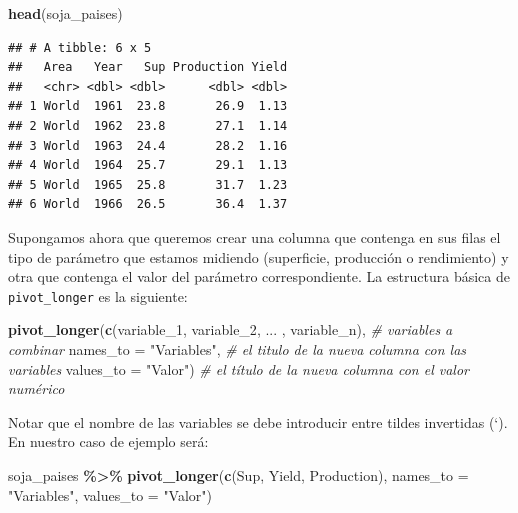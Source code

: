 \documentclass[
]{article}
\newenvironment{Shaded}{\begin{snugshade}}{\end{snugshade}}
\newcommand{\AttributeTok}[1]{\textcolor[rgb]{0.13,0.29,0.53}{#1}}
\newcommand{\CommentTok}[1]{\textcolor[rgb]{0.56,0.35,0.01}{\textit{#1}}}
\newcommand{\FunctionTok}[1]{\textcolor[rgb]{0.13,0.29,0.53}{\textbf{#1}}}
\newcommand{\NormalTok}[1]{#1}
\newcommand{\SpecialCharTok}[1]{\textcolor[rgb]{0.81,0.36,0.00}{\textbf{#1}}}
\newcommand{\StringTok}[1]{\textcolor[rgb]{0.31,0.60,0.02}{#1}}
\begin{document}
\begin{Shaded}
\begin{Highlighting}[]
\FunctionTok{head}\NormalTok{(soja\_paises)}
\end{Highlighting}
\end{Shaded}

\begin{verbatim}
## # A tibble: 6 x 5
##   Area   Year   Sup Production Yield
##   <chr> <dbl> <dbl>      <dbl> <dbl>
## 1 World  1961  23.8       26.9  1.13
## 2 World  1962  23.8       27.1  1.14
## 3 World  1963  24.4       28.2  1.16
## 4 World  1964  25.7       29.1  1.13
## 5 World  1965  25.8       31.7  1.23
## 6 World  1966  26.5       36.4  1.37
\end{verbatim}

Supongamos ahora que queremos crear una columna que contenga en sus
filas el tipo de parámetro que estamos midiendo (superficie, producción
o rendimiento) y otra que contenga el valor del parámetro
correspondiente. La estructura básica de \texttt{pivot\_longer} es la
siguiente:

\begin{Shaded}
\begin{Highlighting}[]
\FunctionTok{pivot\_longer}\NormalTok{(}\FunctionTok{c}\NormalTok{(}\StringTok{\textasciigrave{}}\AttributeTok{variable\_1}\StringTok{\textasciigrave{}}\NormalTok{, }\StringTok{\textasciigrave{}}\AttributeTok{variable\_2}\StringTok{\textasciigrave{}}\NormalTok{, ... , }\StringTok{\textasciigrave{}}\AttributeTok{variable\_n}\StringTok{\textasciigrave{}}\NormalTok{), }\CommentTok{\# variables a combinar}
       \AttributeTok{names\_to =} \StringTok{"Variables"}\NormalTok{, }\CommentTok{\# el titulo de la nueva columna con las variables}
       \AttributeTok{values\_to =} \StringTok{"Valor"}\NormalTok{) }\CommentTok{\# el título de la nueva columna con el valor numérico}
\end{Highlighting}
\end{Shaded}

Notar que el nombre de las variables se debe introducir entre tildes
invertidas (`). En nuestro caso de ejemplo será:

\begin{Shaded}
\begin{Highlighting}[]
\NormalTok{soja\_paises }\SpecialCharTok{\%\textgreater{}\%} \FunctionTok{pivot\_longer}\NormalTok{(}\FunctionTok{c}\NormalTok{(}\StringTok{\textasciigrave{}}\AttributeTok{Sup}\StringTok{\textasciigrave{}}\NormalTok{, }\StringTok{\textasciigrave{}}\AttributeTok{Yield}\StringTok{\textasciigrave{}}\NormalTok{, }\StringTok{\textasciigrave{}}\AttributeTok{Production}\StringTok{\textasciigrave{}}\NormalTok{),}
       \AttributeTok{names\_to =}  \StringTok{"Variables"}\NormalTok{,}
       \AttributeTok{values\_to =} \StringTok{"Valor"}\NormalTok{)}
\end{Highlighting}
\end{Shaded}
\end{document}
